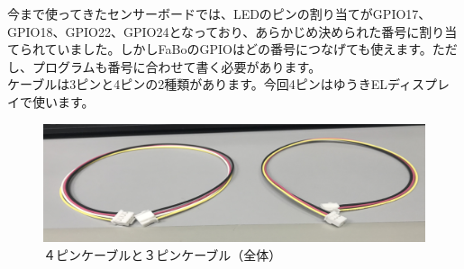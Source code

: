 今まで使ってきたセンサーボードでは、LEDのピンの割り当てがGPIO17、GPIO18、GPIO22、GPIO24となっており、あらかじめ決められた番号に割り当てられていました。しかしFaBoのGPIOはどの番号につなげても使えます。ただし、プログラムも番号に合わせて書く必要があります。\\
ケーブルは3ピンと4ピンの2種類があります。今回4ピンはゆうきELディスプレイで使います。\\
\begin{figure}[h]
\begin{center}
    \includegraphics[scale=0.6]{images/chap05/text05-img013.png}
    \caption{４ピンケーブルと３ピンケーブル（全体）}
\end{center}
\end{figure}
